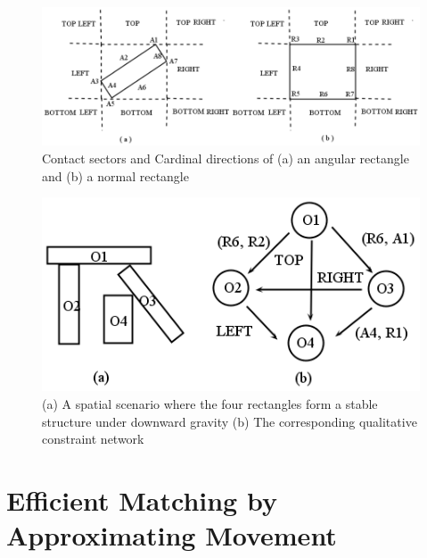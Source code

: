 \documentclass[letterpaper]{article}
\begin{document}
\begin{figure}[t]
\centering\includegraphics[scale=0.25]{EGSR-relations.png}
\vspace{-3mm}
\caption{Contact sectors and Cardinal directions of (a) an angular rectangle and (b) a normal rectangle}
\label{EGSR}
\vspace{-3mm}
\end{figure}

 \begin{figure}[t]
\centering\includegraphics[scale=0.35]{QCN.png}\vspace{-3mm}\caption{(a) A spatial scenario where the four rectangles form a stable structure under downward gravity (b) The corresponding qualitative constraint network}
\label{QCN}
\vspace{-6mm}
\end{figure}
\vspace{-2mm}
\section{Efficient Matching by Approximating Movement}\label{approxM}
\end{document}
